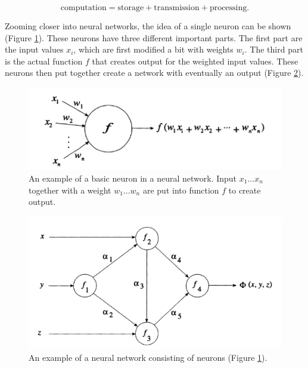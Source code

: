 \documentclass[10pt,a4paper]{report}
\begin{document}
	\begin{equation}
	\label{eq:NeuralModels}
	\text{computation} = \text{storage} + \text{transmission} + 
	\text{processing}.
	\end{equation}
	
	Zooming closer into neural networks, the idea of a single neuron can be 
	shown (Figure \ref{fig:NeurEx}). These neurons have three different 
	important parts. The first part are the input values $x_i$, which are first 
	modified a bit with weights $w_i$. The third part is the actual function 
	$f$ that creates output for the weighted input values. These neurons  then 
	put together create a network with eventually an output (Figure 
	\ref{fig:NeurNetEx}).\cite{rojas2013neural}
	
	\begin{figure}[h!]
		\includegraphics{NeuronExample.PNG}
		\caption{An example of a basic neuron in a neural network. Input 
			$x_1...x_n$ together with a weight $w_1...w_n$ are put into function 
			$f$ to create output. \cite{rojas2013neural}}
		\label{fig:NeurEx}
	\end{figure}
	
	\begin{figure}[h!]
		\includegraphics{NeuralNetworkExample.PNG}
		\caption{An example of a neural network consisting of neurons (Figure 
			\ref{fig:NeurEx}). \cite{rojas2013neural}}
		\label{fig:NeurNetEx}
	\end{figure}
	
\end{document}
